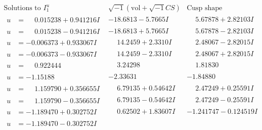 \documentclass[1p]{elsarticle_modified}
\theoremstyle{definition}
\newcommand{\I}{\sqrt{-1}}
\begin{document}
$$\begin{array}{c|c|c}  
\text{Solutions to }I^u_{1}& \I (\text{vol} + \sqrt{-1}CS) & \text{Cusp shape}\\
 \hline 
\begin{aligned}
u &= \phantom{-}0.015238 + 0.941216 I\end{aligned}
 & -18.6813 - 5.7665 I & \phantom{-}5.67878 + 2.82103 I \\ \hline\begin{aligned}
u &= \phantom{-}0.015238 - 0.941216 I\end{aligned}
 & -18.6813 + 5.7665 I & \phantom{-}5.67878 - 2.82103 I \\ \hline\begin{aligned}
u &= -0.006373 + 0.933067 I\end{aligned}
 & \phantom{-}14.2459 + 2.3310 I & \phantom{-}2.48067 - 2.82015 I \\ \hline\begin{aligned}
u &= -0.006373 - 0.933067 I\end{aligned}
 & \phantom{-}14.2459 - 2.3310 I & \phantom{-}2.48067 + 2.82015 I \\ \hline\begin{aligned}
u &= \phantom{-}0.922444\phantom{ +0.000000I}\end{aligned}
 & \phantom{-}3.24298\phantom{ +0.000000I} & \phantom{-}1.81830\phantom{ +0.000000I} \\ \hline\begin{aligned}
u &= -1.15188\phantom{ +0.000000I}\end{aligned}
 & -2.33631\phantom{ +0.000000I} & -1.84880\phantom{ +0.000000I} \\ \hline\begin{aligned}
u &= \phantom{-}1.159790 + 0.356655 I\end{aligned}
 & \phantom{-}6.79135 + 0.54642 I & \phantom{-}2.47249 + 0.25591 I \\ \hline\begin{aligned}
u &= \phantom{-}1.159790 - 0.356655 I\end{aligned}
 & \phantom{-}6.79135 - 0.54642 I & \phantom{-}2.47249 - 0.25591 I \\ \hline\begin{aligned}
u &= -1.189470 + 0.302752 I\end{aligned}
 & \phantom{-}0.62502 + 1.83607 I & -1.241747 - 0.124519 I \\ \hline\begin{aligned}
u &= -1.189470 - 0.302752 I\end{aligned}

\end{array}$$
\end{document}
